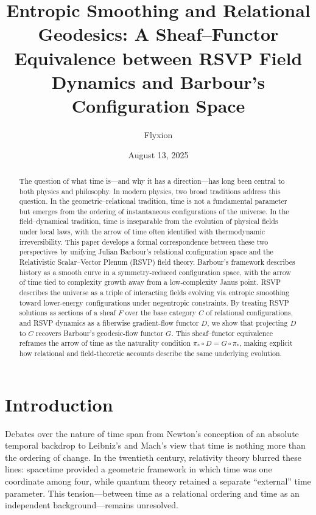 \documentclass[11pt]{article}
\title{Entropic Smoothing and Relational Geodesics: A Sheaf--Functor Equivalence between RSVP Field Dynamics and Barbour's Configuration Space}
\author{Flyxion}
\date{August 13, 2025}
\theoremstyle{plain}
\theoremstyle{definition}
\begin{document}
\maketitle

\begin{abstract}
The question of what time is—and why it has a direction—has long been central to both physics and philosophy. In modern physics, two broad traditions address this question. In the geometric–relational tradition, time is not a fundamental parameter but emerges from the ordering of instantaneous configurations of the universe. In the field–dynamical tradition, time is inseparable from the evolution of physical fields under local laws, with the arrow of time often identified with thermodynamic irreversibility. This paper develops a formal correspondence between these two perspectives by unifying Julian Barbour’s relational configuration space and the Relativistic Scalar–Vector Plenum (RSVP) field theory. Barbour’s framework describes history as a smooth curve in a symmetry-reduced configuration space, with the arrow of time tied to complexity growth away from a low-complexity Janus point. RSVP describes the universe as a triple of interacting fields evolving via entropic smoothing toward lower-energy configurations under negentropic constraints. By treating RSVP solutions as sections of a sheaf $F$ over the base category $C$ of relational configurations, and RSVP dynamics as a fiberwise gradient-flow functor $D$, we show that projecting $D$ to $C$ recovers Barbour’s geodesic-flow functor $G$. This sheaf–functor equivalence reframes the arrow of time as the naturality condition $\pi_* \circ D = G \circ \pi_*$, making explicit how relational and field-theoretic accounts describe the same underlying evolution.
\end{abstract}

\tableofcontents

\section{Introduction}

Debates over the nature of time span from Newton’s conception of an absolute temporal backdrop to Leibniz’s and Mach’s view that time is nothing more than the ordering of change. In the twentieth century, relativity theory blurred these lines: spacetime provided a geometric framework in which time was one coordinate among four, while quantum theory retained a separate “external” time parameter. This tension—between time as a relational ordering and time as an independent background—remains unresolved.
\end{document}
